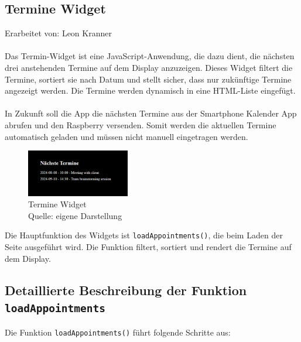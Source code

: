 \newpage

\subsection{Termine Widget}
Erarbeitet von: Leon Kranner \\ \\

\noindent
Das Termin-Widget ist eine JavaScript-Anwendung, die dazu dient, die nächsten drei anstehenden Termine auf dem Display anzuzeigen. Dieses Widget filtert die Termine, sortiert sie nach Datum und stellt sicher, dass nur zukünftige Termine angezeigt werden. Die Termine werden dynamisch in eine HTML-Liste eingefügt. \\ \\
In Zukunft soll die App die nächsten Termine aus der Smartphone Kalender App abrufen und den Raspberry versenden. Somit werden die aktuellen Termine automatisch geladen und müssen nicht manuell eingetragen werden.

\begin{figure}[h]
    \centering
    \includegraphics[width=0.4\textwidth]{pictures/appointments_widget.png}
  \captionsetup{justification=centering, labelformat=simple, singlelinecheck=false}
    \caption[Termine Widget]{Termine Widget\\ Quelle: eigene Darstellung}
\end{figure}

\noindent
Die Hauptfunktion des Widgets ist \texttt{loadAppointments()}, die beim Laden der Seite ausgeführt wird. Die Funktion filtert, sortiert und rendert die Termine auf dem Display.

\subsection*{Detaillierte Beschreibung der Funktion \texttt{loadAppointments}}
Die Funktion \texttt{loadAppointments()} führt folgende Schritte aus:

